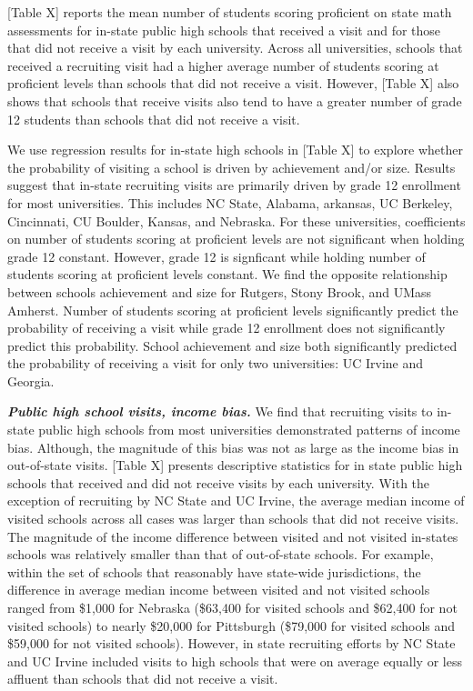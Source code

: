 \documentclass[twoside]{article}
\begin{document}
[Table X] reports the mean number of students scoring proficient on state math assessments for in-state public high schools that received a visit and for those that did not receive a visit by each university. Across all universities, schools that received a recruiting visit had a higher average number of students scoring at proficient levels than schools that did not receive a visit. However, [Table X] also shows that schools that receive visits also tend to have a greater number of grade 12 students than schools that did not receive a visit.

We use regression results for in-state high schools in [Table X] to explore whether the probability of visiting a school is driven by achievement and/or size. Results suggest that in-state recruiting visits are primarily driven by grade 12 enrollment for most universities. This includes NC State, Alabama, arkansas, UC Berkeley, Cincinnati, CU Boulder, Kansas, and Nebraska. For these universities, coefficients on number of students scoring at proficient levels are not significant when holding grade 12 constant. However,  grade 12 is signficant while holding number of students scoring at proficient levels constant. We find the opposite relationship between schools achievement and size for Rutgers, Stony Brook, and UMass Amherst. Number of students scoring at proficient levels significantly predict the probability of receiving a visit while grade 12 enrollment does not significantly predict this probability. School achievement and size both significantly predicted the probability of receiving a visit for only two universities: UC Irvine and Georgia.

\textbf{\textit{Public high school visits, income bias.}} We find that recruiting visits to in-state public high schools from most universities demonstrated patterns of income bias. Although, the magnitude of this bias was not as large as the income bias in out-of-state visits. [Table X] presents descriptive statistics for in state public high schools that received and did not receive visits by each university.  With the exception of recruiting by NC State and UC Irvine, the average median income of visited schools across all cases was larger than schools that did not receive visits. The magnitude of the income difference between visited and not visited in-states schools was relatively smaller than that of out-of-state schools. For example, within the set of schools that reasonably have state-wide jurisdictions, the difference in average median income between visited and not visited schools ranged from \$1,000 for Nebraska (\$63,400 for visited schools and \$62,400 for not visited schools) to nearly \$20,000 for Pittsburgh (\$79,000 for visited schools and \$59,000 for not visited schools). However, in state recruiting efforts by NC State and UC Irvine included visits to high schools that were on average equally or less affluent than schools that did not receive a visit.
\end{document}
